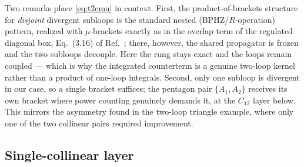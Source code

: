 \documentclass[11pt]{article}
\begin{document}
Two remarks place \eqref{eq:t2cmu} in context. First, the product-of-brackets structure for
\emph{disjoint} divergent subloops is the standard nested (BPHZ/$R$-operation) pattern, realized
with $\mu$-brackets exactly as in the overlap term of the regulated diagonal box, Eq.~(3.16) of
Ref.~\cite{AS}; there, however, the shared propagator is frozen and the two subloops decouple. Here
the rung stays exact and the loops remain coupled --- which is why the integrated counterterm is a
genuine two-loop kernel rather than a product of one-loop integrals. Second, only one subloop is
divergent in our case, so a single bracket suffices; the pentagon pair $\{A_1,A_2\}$ receives its
own bracket where power counting genuinely demands it, at the $C_{12}$ layer below. This mirrors
the asymmetry found in the two-loop triangle example, where only one of the two collinear pairs
required improvement.

\subsection{Single-collinear layer}
\label{sec:C12}
\end{document}
